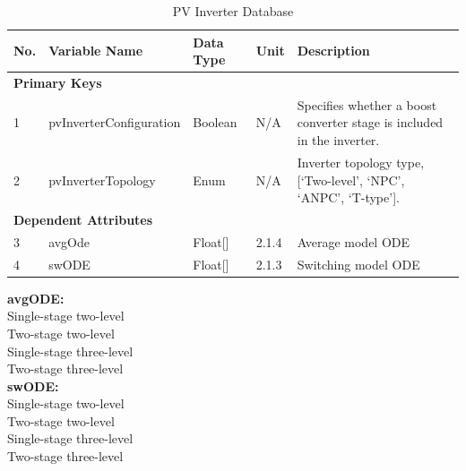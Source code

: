 \documentclass{article}
\begin{document}
\begin{table}[h]
\centering
\caption{PV Inverter Database}
\begin{tabular}{|l|p{3.5cm}|l|l|p{5.5cm}|}
\hline
\textbf{No.} & \textbf{Variable Name} & \textbf{Data Type} & \textbf{Unit} & \textbf{Description} \\ \hline
\multicolumn{5}{|l|}{\textbf{Primary Keys}} \\ \hline
1 & pvInverterConfiguration & Boolean & N/A & Specifies whether a boost converter stage is included in the inverter. \\ \hline
2 & pvInverterTopology & Enum & N/A & Inverter topology type, [`Two-level', `NPC', `ANPC', `T-type']. \\ \hline
\multicolumn{5}{|l|}{\textbf{Dependent Attributes}} \\ \hline
3 & avgOde & Float[] & 2.1.4 & Average model ODE \\ \hline
4 & swODE & Float[] & 2.1.3 & Switching model ODE \\ \hline
\end{tabular}
\end{table}

\textbf{avgODE:}\\
Single-stage two-level\\
Two-stage two-level\\
Single-stage three-level\\
Two-stage three-level\\

\textbf{swODE:}\\
Single-stage two-level\\
Two-stage two-level\\
Single-stage three-level\\
Two-stage three-level
\end{document}
